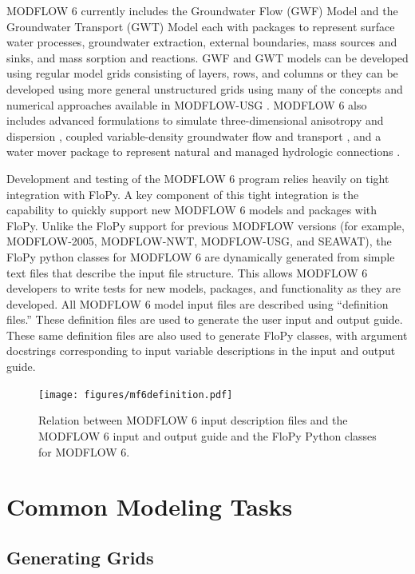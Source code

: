\documentclass[11pt, oneside]{article}   	%
\begin{document}
MODFLOW 6 currently includes the Groundwater Flow (GWF) Model and the Groundwater Transport (GWT) Model each with packages to represent surface water processes,  groundwater extraction, external boundaries, mass sources and sinks, and mass sorption and reactions.  GWF and GWT models can be developed using regular model grids consisting of layers, rows, and columns or they can be developed using more general unstructured grids using many of the concepts and numerical approaches available in MODFLOW-USG  \citep{modflowusg}.  MODFLOW 6 also includes advanced formulations to simulate three-dimensional anisotropy and dispersion \citep{modflow6xt3d}, coupled variable-density groundwater flow and transport \citep{langevin2020hydraulic}, and a water mover package to represent natural and managed hydrologic connections \citep{morway2021use}.

Development and testing of the MODFLOW 6 program relies heavily on tight integration with FloPy.  A key component of this tight integration is the capability to quickly support new MODFLOW 6 models and packages with FloPy.  Unlike the FloPy support for previous MODFLOW versions (for example, MODFLOW-2005, MODFLOW-NWT, MODFLOW-USG, and SEAWAT), the FloPy python classes for MODFLOW 6 are dynamically generated from simple text files that describe the input file structure.  This allows MODFLOW 6 developers to write tests for new models, packages, and functionality as they are developed.  All MODFLOW 6 model input files are described using ``definition files.''  These definition files are used to generate the user input and output guide.  These same definition files are also used to generate FloPy classes, with argument docstrings corresponding to input variable descriptions in the input and output guide.

\begin{figure}[ht!]
	\begin{center}
		\texttt{[image: figures/mf6definition.pdf]}
	\end{center}
	\caption{Relation between MODFLOW 6 input description files and the MODFLOW 6 input and output guide and the FloPy Python classes for MODFLOW 6.}
	\label{fig:mf6definition}
\end{figure}

\section{Common Modeling Tasks}

\subsection{Generating Grids}
\end{document}
